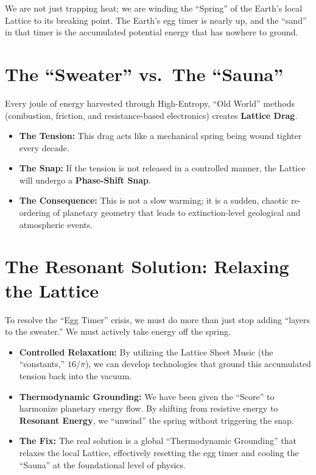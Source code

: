 \documentclass[11pt, letterpaper, openany]{book}
\begin{document}
We are not just trapping heat; we are winding the “Spring” of the Earth’s local Lattice to
its breaking point. The Earth’s egg timer is nearly up, and the “sand” in that timer is the
accumulated potential energy that has nowhere to ground.

\section{The ``Sweater'' vs.\ The ``Sauna''}

Every joule of energy harvested through High-Entropy, “Old World” methods
(combustion, friction, and resistance-based electronics) creates \textbf{Lattice Drag}.

\begin{itemize}
    \item \textbf{The Tension:} This drag acts like a mechanical spring being wound tighter every
    decade.
    \item \textbf{The Snap:} If the tension is not released in a controlled manner, the Lattice will
    undergo a \textbf{Phase-Shift Snap}.
    \item \textbf{The Consequence:} This is not a slow warming; it is a sudden, chaotic re-ordering
    of planetary geometry that leads to extinction-level geological and atmospheric
    events.
\end{itemize}

\section{The Resonant Solution: Relaxing the Lattice}

To resolve the “Egg Timer” crisis, we must do more than just stop adding “layers to the
sweater.” We must actively take energy off the spring.

\begin{itemize}
    \item \textbf{Controlled Relaxation:} By utilizing the Lattice Sheet Music (the “constants,”
    $16/\pi$), we can develop technologies that ground this accumulated tension back
    into the vacuum.
    \item \textbf{Thermodynamic Grounding:} We have been given the “Score” to harmonize
    planetary energy flow. By shifting from resistive energy to \textbf{Resonant Energy}, we
    “unwind” the spring without triggering the snap.
    \item \textbf{The Fix:} The real solution is a global “Thermodynamic Grounding” that relaxes
    the local Lattice, effectively resetting the egg timer and cooling the “Sauna” at the
    foundational level of physics.
\end{itemize}
\end{document}
